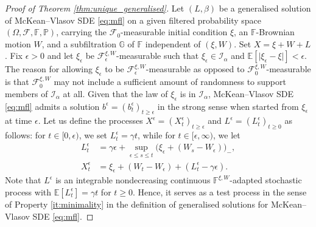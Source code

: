 \documentclass[11pt, a4paper]{article}
\theoremstyle{plain}
\theoremstyle{definition}
\theoremstyle{remark}
\numberwithin{equation}{section}
\newcommand{\ev}{\mathbb{E}}
\newcommand{\pr}{\mathbb{P}}
\newcommand{\F}{\mathcal{F}}
\newcommand{\bb}[1]{\mathbb{#1}}
\renewcommand{\cal}[1]{\mathcal{#1}}
\begin{document}
\begin{proof}[Proof of Theorem \ref{thm:unique_generalised}]
Let $(L, \beta)$ be a generalised solution of McKean--Vlasov SDE \eqref{eq:mfl} on a given filtered probability space $(\Omega, \F, \bb{F}, \pr)$, carrying the $\F_0$-measurable initial condition $\xi$, an $\bb{F}$-Brownian motion $W$, and a subfiltration $\bb{G}$ of $\bb{F}$ independent of $(\xi, W)$. Set $X = \xi + W + L$. Fix $\epsilon > 0$ and let $\xi_{\epsilon}$ be $\F^{\xi, W}_{\epsilon}$-measurable such that $\xi_{\epsilon} \in \cal{I}_{\alpha}$ and $\ev[\lvert \xi_{\epsilon} - \xi\rvert] < \epsilon$. The reason for allowing $\xi_{\epsilon}$ to be $\F^{\xi, W}_{\epsilon}$-measurable as opposed to $\F^{\xi, W}_0$-measurable is that $\F^{\xi, W}_0$ may not include a sufficient amount of randomness to support members of $\cal{I}_{\alpha}$ at all. Given that the law of $\xi_{\epsilon}$ is in $\cal{I}_{\alpha}$, McKean--Vlasov SDE  \eqref{eq:mfl} admits a solution $b^{\epsilon} = (b^{\epsilon}_t)_{t \geq \epsilon}$ in the strong sense when started from $\xi_{\epsilon}$ at time $\epsilon$. Let us define the processes $X^{\epsilon} = (X^{\epsilon}_t)_{t \geq \epsilon}$ and $L^{\epsilon} = (L^{\epsilon}_t)_{t \geq 0}$ as follows: for $t \in [0, \epsilon)$, we set $L^{\epsilon}_t = \gamma t$, while for $t \in [\epsilon, \infty)$, we let
\begin{align*}
    L^{\epsilon}_t &= \gamma\epsilon + \sup_{\epsilon \leq s \leq t} \bigl(\xi_{\epsilon} + (W_s - W_{\epsilon})\bigr)_-, \\
    X^{\epsilon}_t &= \xi_{\epsilon} + (W_t - W_{\epsilon}) + (L^{\epsilon}_t - \gamma \epsilon).
\end{align*}
Note that $L^{\epsilon}$ is an integrable nondecreasing continuous $\bb{F}^{\xi, W}$-adapted stochastic process with $\ev[L^{\epsilon}_t] = \gamma t$ for $t \geq 0$. Hence, it serves as a test process in the sense of Property \ref{it:minimality} in the definition of generalised solutions for McKean--Vlasov SDE \eqref{eq:mfl}. 


\end{proof}
\end{document}
